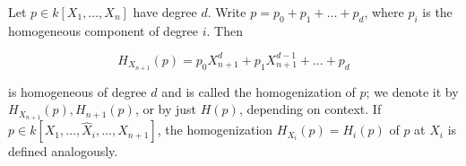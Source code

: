 Let $p \in k[X_1, \ldots, X_n]$ have degree $d$. Write $p = p_0 + p_1 + \ldots + p_d$, where $p_i$ is the homogeneous component of degree $i$. Then

$$H_{X_{n+1}}(p) = p_0 X_{n+1}^d + p_1 X_{n+1}^{d-1} + \ldots + p_d$$

is homogeneous of degree $d$ and is called the homogenization of $p$; we denote it by $H_{X_{n+1}}(p), H_{n+1}(p)$, or by just $H(p)$, depending on context. If $p \in k[X_1, \ldots, \hat{X}_i, \ldots, X_{n+1}]$, the homogenization $H_{X_i}(p) = H_i(p)$ of $p$ at $X_i$ is defined analogously.
